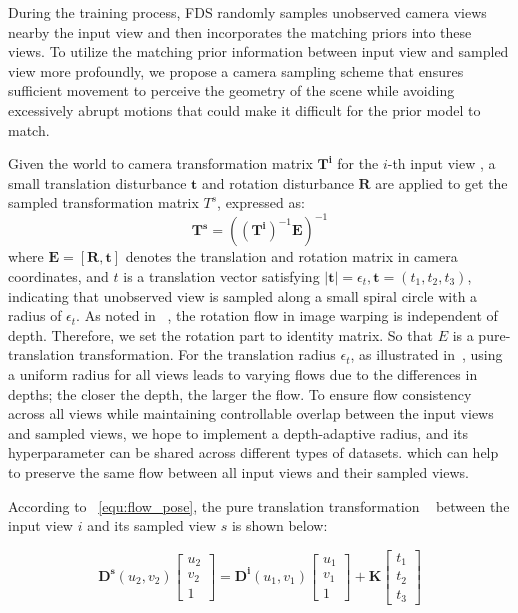 During the training process, FDS randomly
samples unobserved camera views nearby the input view and then incorporates 
the matching priors into these views. 
To utilize the matching prior information between
input view and sampled view more profoundly, 
we propose a camera sampling scheme that ensures sufficient movement to perceive the geometry of the scene while avoiding excessively abrupt motions that could make it difficult for the prior model to match.



Given the world to camera transformation matrix $\bm{T^{i}}$ for the $i$-th input view , 
a small translation disturbance $\bm{t}$ and rotation 
disturbance $\bm{R}$ are applied to get the 
sampled transformation matrix $T^s$, expressed as:
\begin{equation}
\bm{T^s} = ((\bm{T^{i}})^{-1} \bm{E})^{-1}
\label{equ:camera_sampling}
\end{equation}
where $\bm{E}=[\bm{R}, \bm{t}]$ denotes the translation and rotation matrix
in camera coordinates, 
and $t$ is a translation vector satisfying 
$|\bm{t}| = \epsilon_t, \bm{t} = (t_1, t_2, t_3)$,
indicating that unobserved view is sampled along a small
spiral circle with a radius of $\epsilon_t$. 
%
%
As noted in ~\citep{bian2021auto}, the rotation flow in 
image warping is independent of depth. Therefore, we set the 
rotation part to identity matrix. 
So that $E$ is a pure-translation transformation.
%
For the translation radius $\epsilon_t$, as illustrated in~, using
a uniform radius for all views leads to varying flows due to
the differences in depths; the closer the depth, the larger the flow. 
To ensure flow consistency across all views 
while maintaining controllable overlap between the input views and sampled views,
we hope to implement a depth-adaptive radius, and
its hyperparameter can be shared across different types of datasets.
which can help to preserve the same flow 
between all input views and their sampled views.

According to ~\eqref{equ:flow_pose}, 
the pure translation transformation ~\citep{bian2021auto} between the input view $i$ and its sampled view $s$ is shown below:

\begin{equation}
    \bm{D^s}(u_2 , v_2)
    \begin{bmatrix}
     u_2\\
     v_2\\
     1
    \end{bmatrix}
    = 
    \bm{D^i}(u_1 , v_1)
    \begin{bmatrix}
     u_1\\
     v_1\\
     1
    \end{bmatrix} 
         +\bm{K}
    \begin{bmatrix}
     t_1\\
     t_2\\
     t_3
    \end{bmatrix} 
    \label{equ:flow_sampling}
\end{equation}

